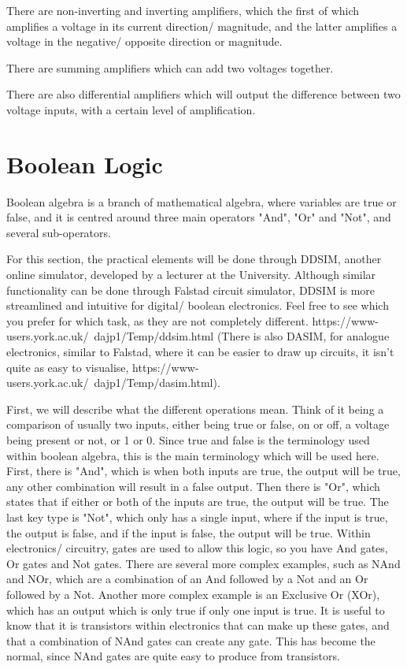 \documentclass[a4paper,11pt]{report}
\begin{document}
There are non-inverting and inverting amplifiers, which the first of which amplifies a voltage in its current direction/ magnitude, and the latter amplifies a voltage in the negative/ opposite direction or magnitude.

There are summing amplifiers which can add two voltages together.

There are also differential amplifiers which will output the difference between two voltage inputs, with a certain level of amplification.

\section{Boolean Logic}

Boolean algebra is a branch of mathematical algebra, where variables are true or false, and it is centred around three main operators "And", "Or" and "Not", and several sub-operators.

For this section, the practical elements will be done through DDSIM, another online simulator, developed by a lecturer at the University. Although similar functionality can be done through Falstad circuit simulator, DDSIM is more streamlined and intuitive for digital/ boolean electronics. Feel free to see which you prefer for which task, as they are not completely different.
https://www-users.york.ac.uk/~dajp1/Temp/ddsim.html
(There is also DASIM, for analogue electronics, similar to Falstad, where it can be easier to draw up circuits, it isn't quite as easy to visualise, https://www-users.york.ac.uk/~dajp1/Temp/dasim.html).

First, we will describe what the different operations mean. Think of it being a comparison of usually two inputs, either being true or false, on or off, a voltage being present or not, or 1 or 0. Since true and false is the terminology used within boolean algebra, this is the main terminology which will be used here. First, there is "And", which is when both inputs are true, the output will be true, any other combination will result in a false output. Then there is "Or", which states that if either or both of the inputs are true, the output will be true. The last key type is "Not", which only has a single input, where if the input is true, the output is false, and if the input is false, the output will be true. Within electronics/ circuitry, gates are used to allow this logic, so you have And gates, Or gates and Not gates. There are several more complex examples, such as NAnd and NOr, which are a combination of an And followed by a Not and an Or followed by a Not. Another more complex example is an Exclusive Or (XOr), which has an output which is only true if only one input is true. It is useful to know that it is transistors within electronics that can make up these gates, and that a combination of NAnd gates can create any gate. This has become the normal, since NAnd gates are quite easy to produce from transistors.
\end{document}
